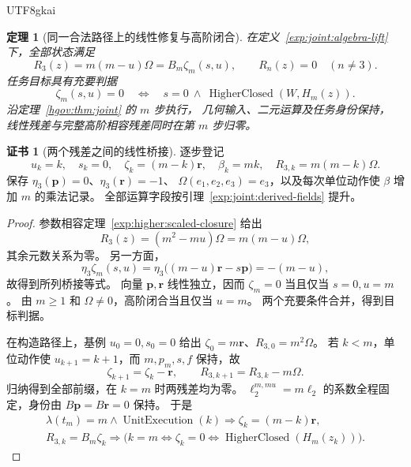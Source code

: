 \documentclass[12pt,a4paper,openany,notitlepage]{report}
\theoremstyle{plain}
\newtheorem{theorem}{定理}[chapter]
\theoremstyle{definition}
\newtheorem*{certificate}{证书}
\theoremstyle{remark}
\def\mathcal#1{#1}\def\mathsf#1{#1}\def\mathbb#1{#1}%
\begin{document}
\begin{CJK*}{UTF8}{gkai}
\begin{theorem}[同一合法路径上的线性修复与高阶闭合]
\label{exp:joint:simultaneous-repair}
在定义~\ref{exp:joint:algebra-lift} 下，全部状态满足
\[
 \mathcal R_3(z)=m(m-u)\Omega
 =\mathcal B_m\zeta_m(s,u),\qquad
 \mathcal R_n(z)=0\quad(n\ne3).
\]
任务目标具有充要判据
\[
 \zeta_m(s,u)=0
 \quad\Longleftrightarrow\quad
 s=0\ \land\ \operatorname{HigherClosed}(W,H_m(z)).
\]
沿定理~\ref{hgov:thm:joint} 的 $m$ 步执行，
几何输入、二元运算及任务身份保持，
线性残差与完整高阶相容残差同时在第 $m$ 步归零。
\end{theorem}
\begin{certificate}[两个残差之间的线性桥接]
逐步登记
\[
 u_k=k,\quad s_k=0,\quad
 \zeta_k=(m-k)\mathbf r,\quad
 \beta_k=mk,\quad
 \mathcal R_{3,k}=m(m-k)\Omega.
\]
保存 $\eta_3(\mathbf p)=0$、$\eta_3(\mathbf r)=-1$、
$\Omega(e_1,e_2,e_3)=e_3$，以及每次单位动作使 $\beta$ 增加 $m$ 的乘法记录。
全部运算字段按引理~\ref{exp:joint:derived-fields} 提升。
\end{certificate}
\begin{proof}
参数相容定理~\ref{exp:higher:scaled-closure} 给出
\[
 \mathcal R_3(z)=(m^2-mu)\Omega=m(m-u)\Omega,
\]
其余元数关系为零。
另一方面，
\[
 \eta_3\zeta_m(s,u)
 =\eta_3\bigl((m-u)\mathbf r-s\mathbf p\bigr)=-(m-u),
\]
故得到所列桥接等式。
向量 $\mathbf p,\mathbf r$ 线性独立，因而
$\zeta_m=0$ 当且仅当 $s=0,u=m$。
由 $m\ge1$ 和 $\Omega\ne0$，高阶闭合当且仅当 $u=m$。
两个充要条件合并，得到目标判据。

在构造路径上，基例 $u_0=0,s_0=0$ 给出
$\zeta_0=m\mathbf r$、$\mathcal R_{3,0}=m^2\Omega$。
若 $k<m$，单位动作使 $u_{k+1}=k+1$，而 $m,p_m,s,f$ 保持，故
\[
 \zeta_{k+1}=\zeta_k-\mathbf r,\qquad
 \mathcal R_{3,k+1}=\mathcal R_{3,k}-m\Omega.
\]
归纳得到全部前缀，在 $k=m$ 时两残差均为零。
$\ell_2^{m,mu}=m\ell_2$ 的系数全程固定，身份由 $B\mathbf p=B\mathbf r=0$ 保持。
于是
\[
 \begin{gathered}
 \lambda(t_m)=m\land\operatorname{UnitExecution}(k)
 \Rightarrow \zeta_k=(m-k)\mathbf r,\\
 \mathcal R_{3,k}=\mathcal B_m\zeta_k
 \Rightarrow
 \bigl(k=m\Longleftrightarrow\zeta_k=0
 \Longleftrightarrow\operatorname{HigherClosed}(H_m(z_k))\bigr).
 \end{gathered}
\]
\end{proof}


\end{CJK*}
\end{document}
